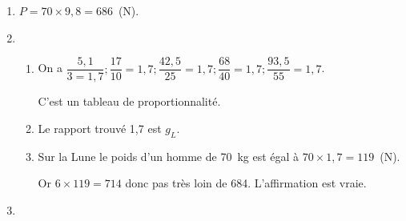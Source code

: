 
\medskip
 
% 
% 
% 
% 
%
 
\begin{enumerate}
\item %
$P = 70 \times 9,8 = 686$~(N). 
\item %
 
%
%

\medskip
 
	\begin{enumerate}
		\item %
On a $\dfrac{5,1}{3 = 1,7} ;    \dfrac{17}{10} = 1,7   ; \dfrac{42,5}{25} = 1,7  ; \dfrac{68}{40} = 1,7 ; \dfrac{93,5}{55} = 1,7$.

C'est un tableau de proportionnalité.
		\item %
Le rapport trouvé 1,7 est $g_L$. 
		\item %
Sur la Lune le poids d'un homme de 70~kg est égal à $70 \times 1,7 = 119$~(N).
		
Or $6 \times 119 = 714$ donc pas très loin de 684. L'affirmation est vraie.
	\end{enumerate} 
\item %



\end{enumerate}
